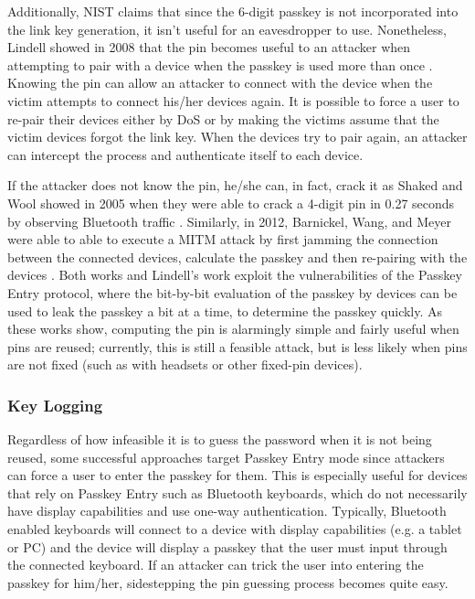 \documentclass{acm_proc_article-sp}
\begin{document}
Additionally, NIST claims that since the 6-digit passkey is not incorporated into the link key generation, it isn't useful for an eavesdropper to use. Nonetheless, Lindell showed in 2008 that the pin becomes useful to an attacker when attempting to pair with a device when the passkey is used more than once \cite{lindell2008attacks}. Knowing the pin can allow an attacker to connect with the device when the victim attempts to connect his/her devices again. It is possible to force a user to re-pair their devices either by DoS \cite{cuthbertbluetooth} or by making the victims assume that the victim devices forgot the link key\cite{shaked2005cracking}. When the devices try to pair again, an attacker can intercept the process and authenticate itself to each device. 

If the attacker does not know the pin, he/she can, in fact, crack it as Shaked and Wool showed in 2005 when they were able to crack a 4-digit pin in 0.27 seconds by observing Bluetooth traffic \cite{shaked2005cracking}. Similarly, in 2012, Barnickel, Wang, and Meyer were able to able to execute a MITM attack by first jamming the connection between the connected devices, calculate the passkey and then re-pairing with the devices \cite{barnickel2012implementing}. Both works and Lindell's work exploit the vulnerabilities of the Passkey Entry protocol, where the bit-by-bit evaluation of the passkey by devices can be used to leak the passkey a bit at a time, to determine the passkey quickly. As these works show, computing the pin is alarmingly simple and fairly useful when pins are reused; currently, this is still a feasible attack, but is less likely when pins are not fixed (such as with headsets or other fixed-pin devices).

\subsubsection{Key Logging}
Regardless of how infeasible it is to guess the password when it is not being reused, some successful approaches target Passkey Entry mode since attackers can force a user to enter the passkey for them. This is especially useful for devices that rely on Passkey Entry such as Bluetooth keyboards, which do not necessarily have display capabilities and use one-way authentication. Typically, Bluetooth enabled keyboards will connect to a device with display capabilities (e.g. a tablet or PC) and the device will display a passkey that the user must input through the connected keyboard. If an attacker can trick the user into entering the passkey for him/her, sidestepping the pin guessing process becomes quite easy. 
\end{document}
